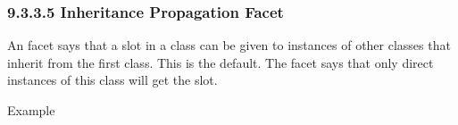 \documentclass[letterpaper,10pt,english]{sphinxmanual}
\begin{document}
\subsubsection{9.3.3.5 Inheritance Propagation Facet}
\label{\detokenize{cool:inheritance-propagation-facet}}
An  facet says that a slot in a class can be given to
instances of other classes that inherit from the first class. This is
the default. The  facet says that only direct instances of
this class will get the slot.

Example

\begin{sphinxVerbatim}[commandchars=\\\{\}]
 
   
     
     
    
    
\PYG{p}{[}\PYG{p}{]}
    
\PYG{p}{[}\PYG{p}{]}
  \PYG{p}{[}\PYG{p}{]} 
\PYG{p}{[}\PYG{p}{]}  
 
 
  \PYG{p}{[}\PYG{p}{]} 
\PYG{p}{[}\PYG{p}{]}  
 
\end{sphinxVerbatim}
\end{document}

